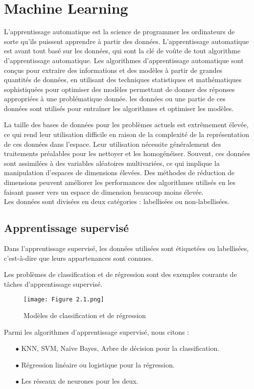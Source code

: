 \section{Machine Learning}
L'apprentissage automatique est la science de programmer les ordinateurs de sorte qu'ils puissent apprendre à partir des données.
L'apprentissage automatique est avant tout basé sur les données, qui sont la clé de voûte de tout algorithme d'apprentissage automatique. Les algorithmes d'apprentissage automatique sont conçus pour extraire des informations et des modèles à partir de grandes quantités de données, en utilisant des techniques statistiques et mathématiques sophistiquées pour optimiser des modèles permettant de donner des réponses appropriées à une problématique donnée. les données ou une partie de ces données sont utilisés pour entraîner les algorithmes et optimiser les modèles.

La taille des bases de données pour les problèmes actuels est extrêmement élevée, ce qui rend leur utilisation difficile en raison de la complexité de la représentation de ces données dans l'espace. Leur utilisation nécessite généralement des traitements préalables pour les nettoyer et les homogénéiser. Souvent, ces données sont assimilées à des variables aléatoires multivariées, ce qui implique la manipulation d'espaces de dimensions élevées. Des méthodes de réduction de dimensions peuvent améliorer les performances des algorithmes utilisés en les faisant passer vers un espace de dimension beaucoup moins élevée.\\
Les données sont divisées en deux catégories : labellisées ou non-labellisées.
\subsection{Apprentissage supervisé}
Dans l’apprentissage supervisé, les données utilisées sont étiquetées ou labellisées, c’est-à-dire que leurs appartenances sont connues.

Les problèmes de classification et de régression sont des exemples courants de tâches d'apprentissage supervisé.
\newpage
\begin{figure}[!h]
  \centering
  \texttt{[image: Figure 2.1.png]}
  \caption{Modèles de classification et de régression}
  \label{fig:Modèles de classification et de régression}
\end{figure}



Parmi les algorithmes d’apprentissage supervisé, nous citons : 
\begin{itemize}
   \item[$\bullet$]KNN, SVM, Naïve Bayes, Arbre de décision pour la classification.
    \item[$\bullet$]Régression linéaire ou logistique pour la régression.
   \item[$\bullet$]Les réseaux de neurones pour les deux.
\end{itemize}

